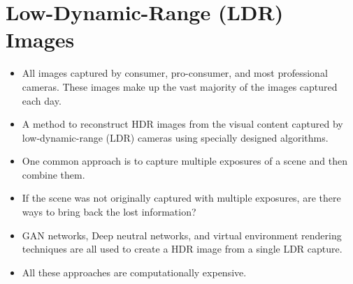 \documentclass{beamer}
\begin{document}
	\section{Low-Dynamic-Range (LDR) Images}
		    \begin{frame}
			    \begin{itemize}
			    \item 
			     All images captured by consumer, pro-consumer, and most professional cameras.  These images make up the vast majority of the images captured each day.  
                \end{itemize}
		    \end{frame}
		    \begin{frame}
			    \begin{itemize}
			    \item 
			    A method to reconstruct HDR images from the visual content
                captured by low-dynamic-range (LDR) cameras using specially designed algorithms.
                
                \item
                One common approach is to capture multiple exposures of a scene and then combine them.  
			    \end{itemize}	
		    \end{frame}
		    \begin{frame}
		    \begin{itemize}
		        \item 
		        If the scene was not originally captured with multiple exposures, are there ways to bring back the lost information?
		        
		    \end{itemize}
		        
		    \end{frame}
		    
		    \begin{frame}
		    \begin{itemize}
		        \item 
		        GAN networks, Deep neutral networks, and virtual environment rendering techniques are all used to create a HDR image from a single LDR capture.  
		        
		        \item
		        All these approaches are computationally expensive. 
             \end{itemize}
		        
		    \end{frame}
		    
\end{document}
